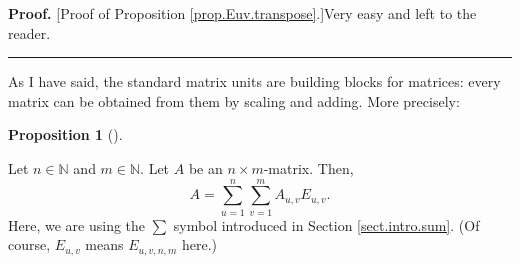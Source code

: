 \documentclass[numbers=enddot,12pt,final,onecolumn,notitlepage]{scrartcl}%
\theoremstyle{definition}
\newtheorem{prop}[theo]{Proposition}
\newenvironment{proposition}[1][]
{\begin{prop}[#1]\begin{leftbar}}
{\end{leftbar}\end{prop}}
\newenvironment{proof}[1][Proof]{\noindent\textbf{#1.} }{\ \rule{0.5em}{0.5em}}
\let\sumnonlimits\sum
\renewcommand{\sum}{\sumnonlimits\limits}
\begin{document}
\begin{proof}
[Proof of Proposition \ref{prop.Euv.transpose}.]Very easy and left to the reader.
\end{proof}

As I have said, the standard matrix units are building blocks for matrices:
every matrix can be obtained from them by scaling and adding. More precisely:

\begin{proposition}
\label{prop.Euv.A=sum}Let $n\in\mathbb{N}$ and $m\in\mathbb{N}$. Let $A$ be an
$n\times m$-matrix. Then,%
\[
A=\sum_{u=1}^{n}\sum_{v=1}^{m}A_{u,v}E_{u,v}.
\]
Here, we are using the $\sum$ symbol introduced in Section
\ref{sect.intro.sum}. (Of course, $E_{u,v}$ means $E_{u,v,n,m}$ here.)
\end{proposition}
\end{document}
